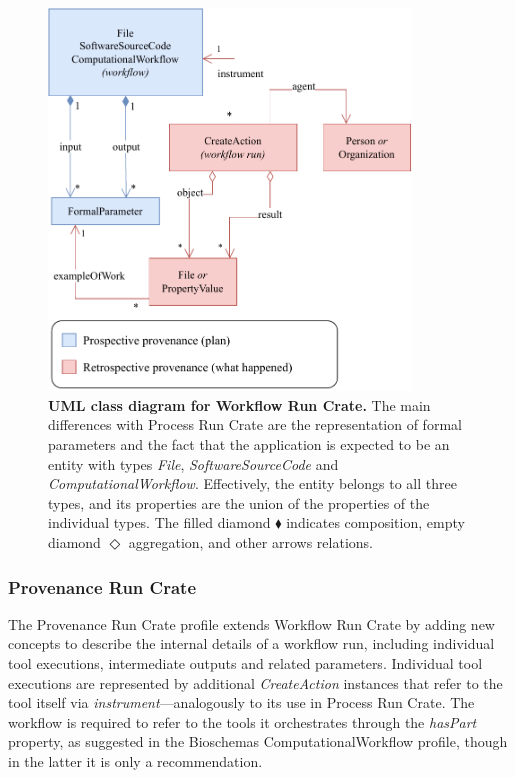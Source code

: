 \begin{figure}[htp]
  \centering
  \includegraphics[width=26em]{figures/ch54/wrroc-figure2.drawio.pdf}
\caption[UML class diagram]{{\bf UML class diagram for Workflow Run Crate.}
The main differences with Process Run Crate are the representation of formal parameters and the fact that the application is expected to be an entity with types \emph{File}, \emph{SoftwareSourceCode} and \emph{ComputationalWorkflow}.
Effectively, the entity belongs to all three types, and its properties are the union of the properties of the individual types.
The filled diamond $\blacklozenge$ indicates composition, empty diamond $\Diamond$ aggregation, and other arrows relations.
}
\label{ch54:fig:workflow_crate_er}
\end{figure}


\subsubsection{Provenance Run Crate}\label{ch54:provenance-run-crate}

The Provenance Run Crate profile \cite{WRROC 2023c} extends Workflow Run Crate by adding new concepts to describe the internal details of a workflow run, including individual tool executions, intermediate outputs and related parameters.
Individual tool executions are represented by additional \emph{CreateAction} instances that refer to the tool itself via \emph{instrument}---analogously to its use in Process Run Crate.
The workflow is required to refer to the tools it orchestrates through the \emph{hasPart} property, as suggested in the Bioschemas ComputationalWorkflow profile, though in the latter it is only a recommendation.

